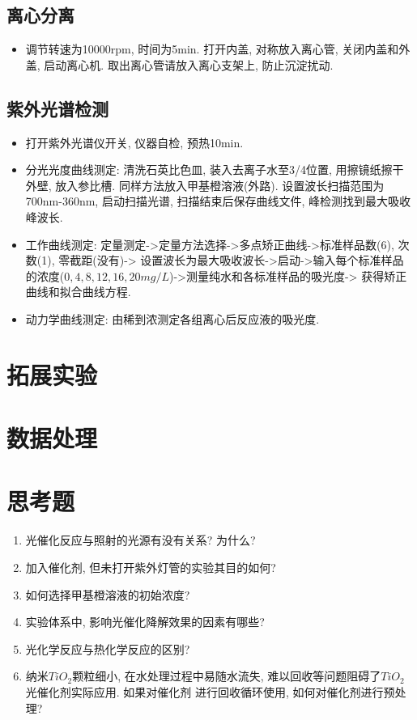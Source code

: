\documentclass[a4paper]{article}
\begin{document}
\subsection{离心分离}
\begin{itemize}
	\item 调节转速为10000rpm, 时间为5min. 打开内盖, 对称放入离心管, 关闭内盖和外盖, 启动离心机.
	取出离心管请放入离心支架上, 防止沉淀扰动.
\end{itemize}
\subsection{紫外光谱检测}
\begin{itemize}
	\item 打开紫外光谱仪开关, 仪器自检, 预热10min.
	\item 分光光度曲线测定: 清洗石英比色皿, 装入去离子水至3/4位置, 用擦镜纸擦干外壁, 放入参比槽.
	同样方法放入甲基橙溶液(外路). 设置波长扫描范围为700nm-360nm, 启动扫描光谱, 扫描结束后保存曲线文件, 
	峰检测找到最大吸收峰波长.
	\item 工作曲线测定: 定量测定->定量方法选择->多点矫正曲线->标准样品数(6), 次数(1), 零截距(没有)->
	设置波长为最大吸收波长->启动->输入每个标准样品的浓度($0, 4, 8, 12, 16, 20mg/L$)->测量纯水和各标准样品的吸光度->
	获得矫正曲线和拟合曲线方程.
	\item 动力学曲线测定: 由稀到浓测定各组离心后反应液的吸光度.
\end{itemize}
\section{拓展实验}

\newpage
\section{数据处理}

\newpage
\section{思考题}
\begin{enumerate}
	\item 光催化反应与照射的光源有没有关系? 为什么?
	\item 加入催化剂, 但未打开紫外灯管的实验其目的如何?
	\item 如何选择甲基橙溶液的初始浓度?
	\item 实验体系中, 影响光催化降解效果的因素有哪些?
	\item 光化学反应与热化学反应的区别?
	\item 纳米$TiO_{2}$颗粒细小, 在水处理过程中易随水流失, 
	难以回收等问题阻碍了$TiO_{2}$光催化剂实际应用. 如果对催化剂
	进行回收循环使用, 如何对催化剂进行预处理?

\end{enumerate}
\newpage
\end{document}
